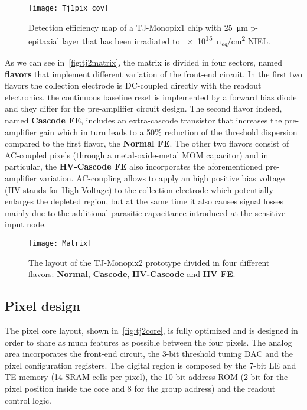 \begin{figure}[h!]
\centering
\texttt{[image: Tj1pix\_cov]}
\caption{Detection efficiency map of a TJ-Monopix1 chip with \SI{25}{\micro m} p-epitaxial layer that has been irradiated to \SI{e15}{n_{\textit{eq}}/cm^{2}} NIEL.}
\label{fig:tj1pix_cov}
\end{figure}

As we can see in~\autoref{fig:tj2matrix}, the matrix is divided in four sectors, named \textbf{flavors} that implement different variation of the front-end circuit. In the first two flavors the collection electrode is DC-coupled directly with the readout electronics,  the continuous baseline reset is implemented by a forward bias diode and they differ for the pre-amplifier circuit design. The second flavor indeed, named \textbf{Cascode FE}, includes an extra-cascode transistor that increases the pre-amplifier gain which in turn leads to a 50\% reduction of the threshold dispersion compared to the first flavor, the \textbf{Normal FE}. The other two flavors consist of AC-coupled pixels (through a metal-oxide-metal MOM capacitor) and in particular, the \textbf{HV-Cascode FE} also incorporates the aforementioned pre-amplifier variation. AC-coupling allows to apply an high positive bias voltage (HV stands for High Voltage) to the collection electrode which potentially enlarges the depleted region, but at the same time it also causes signal losses mainly due to the additional parasitic capacitance introduced at the sensitive input node.\\


\begin{figure}[h!]
\centering
\texttt{[image: Matrix]}
\caption{The layout of the TJ-Monopix2 prototype divided in four different flavors: \textbf{Normal}, \textbf{Cascode}, \textbf{HV-Cascode} and \textbf{HV FE}.}
\label{fig:tj2matrix}
\end{figure}



\subsection{Pixel design}

The  pixel core layout, shown in~\autoref{fig:tj2core}, is fully optimized and is designed in order to share as much features as possible between the four pixels. The analog area incorporates the front-end circuit, the 3-bit threshold tuning DAC and the pixel configuration registers. The digital region is composed by the 7-bit LE and TE memory (14 SRAM cells per pixel), the 10 bit address ROM (2 bit for the pixel position inside the core and 8 for the group address) and the readout control logic. 

